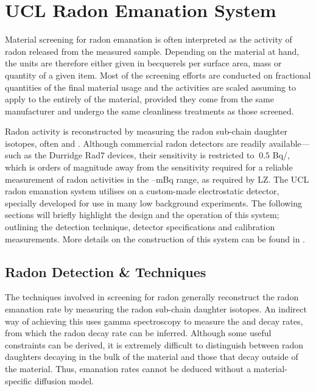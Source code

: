 


\section{UCL Radon Emanation System}
\label{sec:ucl_radon_system}

Material screening for radon emanation is often interpreted as the activity of radon released from the measured sample. Depending on the material at hand, the units are therefore either given in becquerels per surface area, mass or quantity of a given item. Most of the screening efforts are conducted on fractional quantities of the final material usage and the activities are scaled assuming to apply to the entirely of the material, provided they come from the same manufacturer and undergo the same cleanliness treatments as those screened.

Radon activity is reconstructed by measuring the radon sub-chain daughter isotopes, often \PoTOE{} and \PoTOF{}. Although commercial radon detectors are readily available---such as the Durridge Rad7 devices, their sensitivity is restricted to $~0.5$ Bq/\cubicmeter{}, which is orders of magnitude away from the sensitivity required for a reliable measurement of radon activities in the --mBq range, as required by LZ. The UCL radon emanation system utilises on a custom-made electrostatic detector, specially developed for use in many low background experiments. The following sections will briefly highlight the design and the operation of this system; outlining the detection technique, detector specifications and calibration measurements. More details on the construction of this system can be found in \cite{mott_2013, xin_2017}.


\subsection{Radon Detection \& Techniques}
\label{secsec:rn_detection_techniques}

The techniques involved in screening for radon generally reconstruct the radon emanation rate by measuring the radon sub-chain daughter isotopes. An indirect way of achieving this uses gamma spectroscopy to measure the \BiTOF{} and \PbTOF{} decay rates, from which the radon decay rate can be inferred. Although some useful constraints can be derived, it is extremely difficult to distinguish between radon daughters decaying in the bulk of the material and those that decay outside of the material. Thus, emanation rates cannot be deduced without a material-specific diffusion model.

